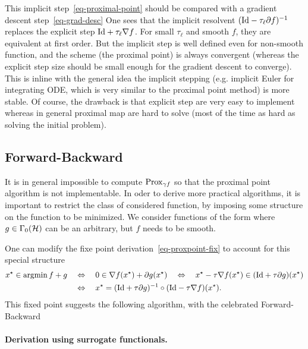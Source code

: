 This implicit step~\eqref{eq-proximal-point} should be compared with a gradient descent step~\eqref{eq-grad-desc}
One sees that the implicit resolvent $(\mathrm{Id}-\tau_\ell \partial f)^{-1}$ replaces the explicit step $\mathrm{Id}+\tau_\ell \nabla f$. For small $\tau_\ell$ and smooth $f$, they are equivalent at first order. But the implicit step is well defined even for non-smooth function, and the scheme (the proximal point) is always convergent (whereas the explicit step size should be small enough for the gradient descent to converge). This is inline with the general idea the implicit stepping (e.g. implicit Euler for integrating ODE, which is very similar to the proximal point method) is more stable. Of course, the drawback is that explicit step are very easy to implement whereas in general proximal map are hard to solve (most of the time as hard as solving the initial problem).


\subsection{Forward-Backward}
\label{sec-fb}

It is in general impossible to compute $\operatorname{Prox}_{\gamma f}$ so that the proximal point algorithm is not implementable.
%
In oder to derive more practical algorithms, it is important to restrict the class of considered function, by imposing some structure on the function to be minimized. We consider functions of the form
where $g \in \Gamma_0(\mathcal{H})$ can be an arbitrary, but $f$ needs to be smooth.

One can modify the fixe point derivation~\eqref{eq-proxpoint-fix} to account for this special structure
\begin{align*}
 	x^\star \in \operatorname{argmin} f + g
	& \quad\Leftrightarrow\quad
	0 \in \nabla f(x^\star) + \partial g(x^\star) 
	\quad\Leftrightarrow\quad
	x^\star - \tau \nabla f(x^\star) \in (\mathrm{Id}+\tau \partial g)(x^\star) \\
	& \quad\Leftrightarrow\quad
	x^\star = ( \mathrm{Id} + \tau \partial g )^{-1} \circ ( \mathrm{Id} - \tau \nabla f ) (x^\star).
\end{align*}
This fixed point suggests the following algorithm, with the celebrated Forward-Backward


\paragraph{Derivation using surrogate functionals.}


